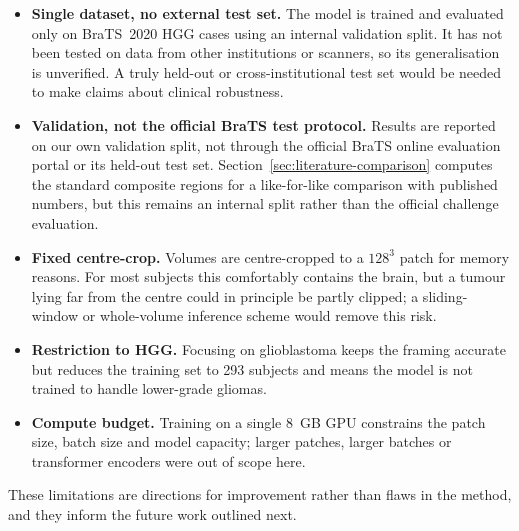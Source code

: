 \begin{itemize}
  \item \textbf{Single dataset, no external test set.} The model is trained and
        evaluated only on BraTS~2020 HGG cases using an internal validation split.
        It has not been tested on data from other institutions or scanners, so its
        generalisation is unverified. A truly held-out or cross-institutional test
        set would be needed to make claims about clinical robustness.
  \item \textbf{Validation, not the official BraTS test protocol.} Results are
        reported on our own validation split, not through the official BraTS
        online evaluation portal or its held-out test set. Section~\ref{sec:literature-comparison}
        computes the standard composite regions for a like-for-like comparison
        with published numbers, but this remains an internal split rather than
        the official challenge evaluation.
  \item \textbf{Fixed centre-crop.} Volumes are centre-cropped to a $128^3$ patch
        for memory reasons. For most subjects this comfortably contains the brain,
        but a tumour lying far from the centre could in principle be partly
        clipped; a sliding-window or whole-volume inference scheme would remove
        this risk.
  \item \textbf{Restriction to HGG.} Focusing on glioblastoma keeps the framing
        accurate but reduces the training set to 293 subjects and means the model
        is not trained to handle lower-grade gliomas.
  \item \textbf{Compute budget.} Training on a single 8~GB GPU constrains the
        patch size, batch size and model capacity; larger patches, larger batches
        or transformer encoders were out of scope here.
\end{itemize}

These limitations are directions for improvement rather than flaws in the method,
and they inform the future work outlined next.

